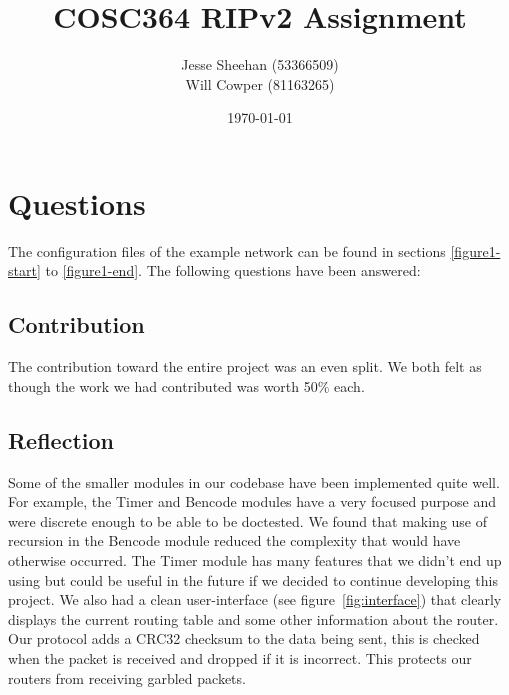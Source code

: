 \documentclass[11pt]{article} %
\title{COSC364 RIPv2 Assignment}
\date{\today}
\author{Jesse Sheehan (53366509)\\ Will Cowper (81163265)}
\begin{document}
\maketitle

\tableofcontents

\newpage



\section{Questions} \label{questions}

The configuration files of the example network can be found in sections \ref{figure1-start} to \ref{figure1-end}. The following questions have been answered:

\subsection{Contribution}
The contribution toward the entire project was an even split. We both felt as though the work we had contributed was worth 50\% each.

\subsection{Reflection} \label{reflection}

Some of the smaller modules in our codebase have been implemented quite well. For example, the Timer and Bencode modules have a very focused purpose and were discrete enough to be able to be doctested.
We found that making use of recursion in the Bencode module reduced the complexity that would have otherwise occurred.
The Timer module has many features that we didn't end up using but could be useful in the future if we decided to continue developing this project.
We also had a clean user-interface (see figure\ \ref{fig:interface}) that clearly displays the current routing table and some other information about the router.
Our protocol adds a CRC32 checksum to the data being sent, this is checked when the packet is received and dropped if it is incorrect. This protects our routers from receiving garbled packets.
\end{document}
